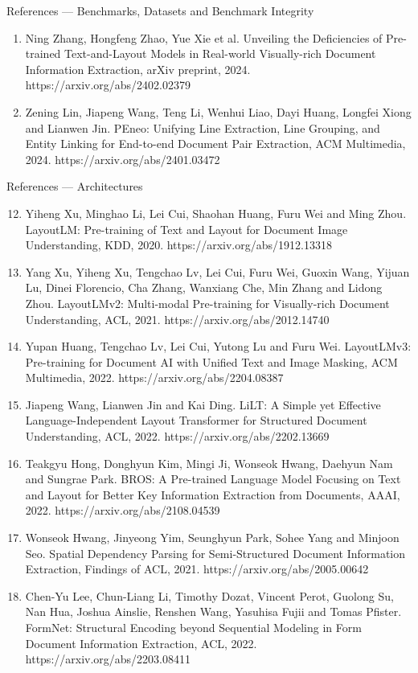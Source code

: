 \documentclass[aspectratio=169, 11pt]{beamer}
\newcommand{\reffont}{\fontsize{4.6}{5.2}\selectfont}
\begin{document}
\begin{frame}{References — Benchmarks, Datasets and Benchmark Integrity}
{\begin{enumerate}
    \item Ning Zhang, Hongfeng Zhao, Yue Xie et al. Unveiling the Deficiencies of Pre-trained Text-and-Layout Models in Real-world Visually-rich Document Information Extraction, arXiv preprint, 2024. https://arxiv.org/abs/2402.02379
    \item Zening Lin, Jiapeng Wang, Teng Li, Wenhui Liao, Dayi Huang, Longfei Xiong and Lianwen Jin. PEneo: Unifying Line Extraction, Line Grouping, and Entity Linking for End-to-end Document Pair Extraction, ACM Multimedia, 2024. https://arxiv.org/abs/2401.03472
  \end{enumerate}}
\end{frame}

\begin{frame}{References — Architectures}
  \reffont
  {\setlength{\itemsep}{0pt}\setlength{\topsep}{1pt}\setlength{\parsep}{0pt}
  \begin{enumerate}\setcounter{enumi}{11}
    \item Yiheng Xu, Minghao Li, Lei Cui, Shaohan Huang, Furu Wei and Ming Zhou. LayoutLM: Pre-training of Text and Layout for Document Image Understanding, KDD, 2020. https://arxiv.org/abs/1912.13318
    \item Yang Xu, Yiheng Xu, Tengchao Lv, Lei Cui, Furu Wei, Guoxin Wang, Yijuan Lu, Dinei Florencio, Cha Zhang, Wanxiang Che, Min Zhang and Lidong Zhou. LayoutLMv2: Multi-modal Pre-training for Visually-rich Document Understanding, ACL, 2021. https://arxiv.org/abs/2012.14740
    \item Yupan Huang, Tengchao Lv, Lei Cui, Yutong Lu and Furu Wei. LayoutLMv3: Pre-training for Document AI with Unified Text and Image Masking, ACM Multimedia, 2022. https://arxiv.org/abs/2204.08387
    \item Jiapeng Wang, Lianwen Jin and Kai Ding. LiLT: A Simple yet Effective Language-Independent Layout Transformer for Structured Document Understanding, ACL, 2022. https://arxiv.org/abs/2202.13669
    \item Teakgyu Hong, Donghyun Kim, Mingi Ji, Wonseok Hwang, Daehyun Nam and Sungrae Park. BROS: A Pre-trained Language Model Focusing on Text and Layout for Better Key Information Extraction from Documents, AAAI, 2022. https://arxiv.org/abs/2108.04539
    \item Wonseok Hwang, Jinyeong Yim, Seunghyun Park, Sohee Yang and Minjoon Seo. Spatial Dependency Parsing for Semi-Structured Document Information Extraction, Findings of ACL, 2021. https://arxiv.org/abs/2005.00642
    \item Chen-Yu Lee, Chun-Liang Li, Timothy Dozat, Vincent Perot, Guolong Su, Nan Hua, Joshua Ainslie, Renshen Wang, Yasuhisa Fujii and Tomas Pfister. FormNet: Structural Encoding beyond Sequential Modeling in Form Document Information Extraction, ACL, 2022. https://arxiv.org/abs/2203.08411

\end{enumerate}}
\end{frame}
\end{document}
